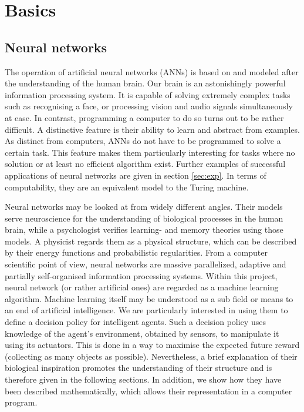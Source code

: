 \documentclass[10pt,a4paper,DIV=11]{scrreprt}
\begin{document}
\chapter{Basics}
\label{ch:basics}
\section{Neural networks}
The operation of artificial neural networks (ANNs) is based on and modeled after the understanding of the human brain. 
Our brain is an astonishingly powerful information processing system. It is capable of solving extremely complex tasks such as recognising a face, or
processing vision and audio signals simultaneously at ease. In contrast, programming a computer to do so turns out to be rather difficult.
A distinctive feature is their ability to learn and abstract from examples. As distinct from computers, ANNs do not have to be programmed to solve 
a certain task. This feature makes them particularly interesting for tasks where no solution or at least no efficient algorithm
exist. Further examples of successful applications of neural networks are given in section \ref{sec:exp}.
In terms of computability, they are an equivalent model to the Turing machine.\cite{NURING}

Neural networks may be looked at from widely different angles. Their models serve neuroscience for the understanding of biological processes 
in the human brain, while a psychologist verifies learning- and memory theories using those models. A physicist regards them as a physical structure,
which can be described by their energy functions and probabilistic regularities. From a computer scientific point of view, neural networks
are massive parallelized, adaptive and partially self-organised information processing systems. \cite{NNGER}
Within this project, neural network (or rather artificial ones) are regarded as a machine learning algorithm. 
Machine learning itself may be understood as a sub field or means to an end of artificial intelligence.
We are particularly interested in using them to define a decision policy for intelligent agents. Such a decision policy uses knowledge of the agent's
environment, obtained by sensors, to manipulate it using its actuators. This is done in a way to maximise the expected future reward (collecting as
many objects as possible). Nevertheless, a brief explanation of their biological inspiration promotes the understanding of their structure and is 
therefore given in the following sections. In addition, we show how they have been described mathematically, which allows their representation 
in a computer program.
\end{document}
